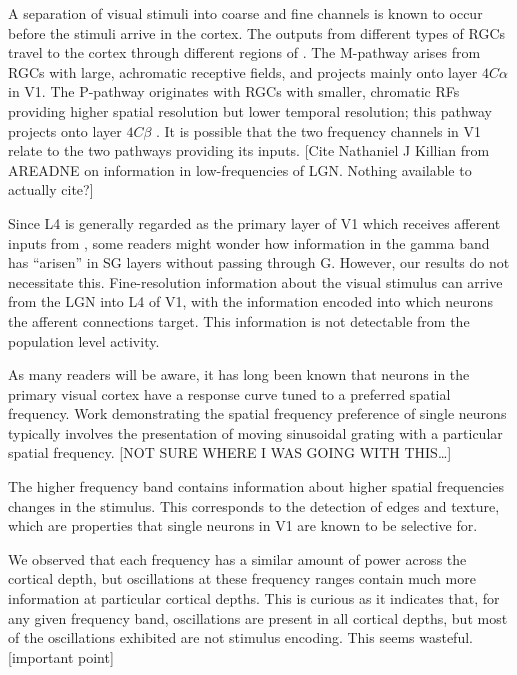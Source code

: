 A separation of visual stimuli into coarse and fine channels is known to occur before the stimuli arrive in the cortex.
The outputs from different types of \acp{RGC} travel to the cortex through different regions of .
The M-pathway arises from \acp{RGC} with large, achromatic receptive fields, and projects mainly onto layer $4C\alpha$ in \ac{V1}.
The P-pathway originates with \acp{RGC} with smaller, chromatic \acp{RF} providing higher spatial resolution but lower temporal resolution; this pathway projects onto layer $4C\beta$ \citep{Callaway1998}.
It is possible that the two frequency channels in \ac{V1} relate to the two pathways providing its inputs.
[Cite Nathaniel J Killian from AREADNE on information in low-frequencies of \ac{LGN}.
Nothing available to actually cite?]

Since \ac{L4} is generally regarded as the primary layer of \ac{V1} which receives afferent inputs from , some readers might wonder how information in the gamma band has ``arisen'' in \ac{SG} layers without passing through \ac{G}.
However, our results do not necessitate this.
Fine-resolution information about the visual stimulus can arrive from the \ac{LGN} into \ac{L4} of \ac{V1}, with the information encoded into which neurons the afferent connections target.
This information is not detectable from the population level activity.


As many readers will be aware, it has long been known that neurons in the primary visual cortex have a response curve tuned to a preferred spatial frequency.
Work demonstrating the spatial frequency preference of single neurons typically involves the presentation of moving sinusoidal grating with a particular spatial frequency.
[NOT SURE WHERE I WAS GOING WITH THIS{\dots}]

The higher frequency band contains information about higher spatial frequencies changes in the stimulus.
This corresponds to the detection of edges and texture, which are properties that single neurons in \ac{V1} are known to be selective for.


We observed that each frequency has a similar amount of power across the cortical depth, but oscillations at these frequency ranges contain much more information at particular cortical depths.
This is curious as it indicates that, for any given frequency band, oscillations are present in all cortical depths, but most of the oscillations exhibited are not stimulus encoding.
This seems wasteful.
[important point]

